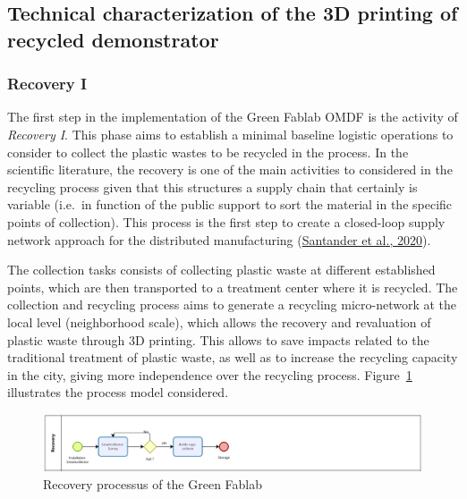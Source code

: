 \documentclass[
  11pt,
]{article}
\begin{document}
\hypertarget{technical-characterization-of-the-3d-printing-of-recycled-demonstrator}{%
\subsection{Technical characterization of the 3D printing of recycled
demonstrator}\label{technical-characterization-of-the-3d-printing-of-recycled-demonstrator}}

\hypertarget{recovery-i}{%
\subsubsection{Recovery I}\label{recovery-i}}

The first step in the implementation of the Green Fablab OMDF is the
activity of \emph{Recovery I}. This phase aims to establish a minimal
baseline logistic operations to consider to collect the plastic wastes
to be recycled in the process. In the scientific literature, the
recovery is one of the main activities to considered in the recycling
process given that this structures a supply chain that certainly is
variable (i.e.~in function of the public support to sort the material in
the specific points of collection). This process is the first step to
create a closed-loop supply network approach for the distributed
manufacturing (\protect\hyperlink{ref-Santander2020}{Santander et al.,
2020}).

The collection tasks consists of collecting plastic waste at different
established points, which are then transported to a treatment center
where it is recycled. The collection and recycling process aims to
generate a recycling micro-network at the local level (neighborhood
scale), which allows the recovery and revaluation of plastic waste
through 3D printing. This allows to save impacts related to the
traditional treatment of plastic waste, as well as to increase the
recycling capacity in the city, giving more independence over the
recycling process. Figure~\ref{fig-recovery} illustrates the process
model considered.

\begin{figure}

{\centering \includegraphics{figures/Recovery.png}

}

\caption{\label{fig-recovery}Recovery processus of the Green Fablab}

\end{figure}
\end{document}
